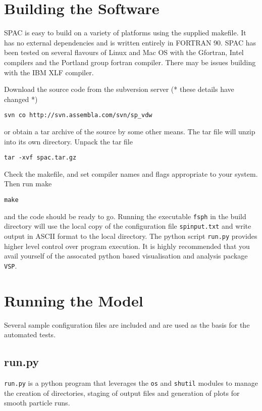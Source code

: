 
\section{Building the Software}
SPAC is easy to build on a variety of platforms using the supplied makefile. It
has no external dependencies and is written entirely in FORTRAN 90.  SPAC has
been tested on several flavours of Linux and Mac OS with the Gfortran, Intel
compilers and the Portland group fortran compiler. There may be issues building
with the IBM XLF compiler.

Download the source code from the subversion server (* these details have changed *)

\begin{verbatim}
svn co http://svn.assembla.com/svn/sp_vdw
\end{verbatim}

or obtain a tar archive of the source by some other means. The tar file will
unzip into its own directory. Unpack the tar file 

\begin{verbatim}
tar -xvf spac.tar.gz
\end{verbatim}

Check the makefile, and set compiler names and flags appropriate to your
system. Then run make

\begin{verbatim}
make
\end{verbatim}

and the code should be ready to go. Running the executable \texttt{fsph} in the
build directory will use the local copy of the configuration file
\texttt{spinput.txt} and write output in ASCII format to the local directory.
The python script \texttt{run.py} provides higher level control over program
execution. It is highly recommended that you avail yourself of the assocated
python based visualisation and analysis package \texttt{VSP}.

\section{Running the Model}
Several sample configuration files are included and are used as the basis for
the automated tests.

\subsection{run.py}
\texttt{run.py} is a python program that leverages the \texttt{os} and \texttt{shutil} modules
to manage the creation of directories, staging of output files and generation of plots for
smooth particle runs.


